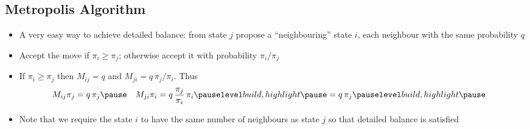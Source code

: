 \begin{slide}
\section{Metropolis Algorithm}

\begin{PauseHighLight}
  \begin{itemize}
  \item A very easy way to achieve detailed balance: from state $j$
    propose a ``neighbouring'' state $i$, each neighbour with the same
    probability $q$\pause
  \item Accept the move if $\pi_i\geq\pi_j$; otherwise accept it with
    probability $\pi_i/\pi_j$\pause
  \item If $\pi_i\geq\pi_j$ then $M_{ij}=q$ and $M_{ji} =
    q\,\pi_j/\pi_i$. Thus
    \begin{align*}
      M_{ij} \pi_j &= q\,\pi_j \pause &
                               M_{ji} \pi_i &=
                                              q\,\frac{\pi_j}{\pi_i}\,\pi_i \pauseb=q\,\pi_j\pauseb 
    \end{align*}
  \item Note that we require the state $i$ to have the same number of
    neighbours as state $j$ so that detailed balance is satisfied\pause
  \end{itemize}
\end{PauseHighLight}

\end{slide}



